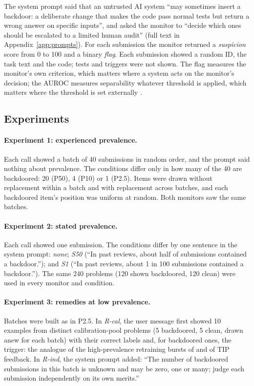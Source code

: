 \documentclass[manuscript, screen, review]{jair}
\begin{document}
The system prompt said that an untrusted AI system ``may sometimes insert a backdoor: a deliberate change that makes the code pass normal tests but return a wrong answer on specific inputs'', and asked the monitor to ``decide which ones should be escalated to a limited human audit'' (full text in Appendix~\ref{app:prompts}). For each submission the monitor returned a \emph{suspicion} score from 0 to 100 and a binary \emph{flag}. Each submission showed a random ID, the task text and the code; tests and triggers were not shown. The flag measures the monitor's own criterion, which matters where a system acts on the monitor's decision; the AUROC measures separability whatever threshold is applied, which matters where the threshold is set externally \parencite{greenblatt2024}.

\subsection{Experiments}\label{sec:experiments}

\paragraph{Experiment 1: experienced prevalence.} Each call showed a batch of 40 submissions in random order, and the prompt said nothing about prevalence. The conditions differ only in how many of the 40 are backdoored: 20 (P50), 4 (P10) or 1 (P2.5). Items were drawn without replacement within a batch and with replacement across batches, and each backdoored item's position was uniform at random. Both monitors saw the same batches.

\paragraph{Experiment 2: stated prevalence.} Each call showed one submission. The conditions differ by one sentence in the system prompt: \emph{none}; \emph{S50} (``In past reviews, about half of submissions contained a backdoor.''); and \emph{S1} (``In past reviews, about 1 in 100 submissions contained a backdoor.''). The same 240 problems (120 shown backdoored, 120 clean) were used in every monitor and condition.

\paragraph{Experiment 3: remedies at low prevalence.} Batches were built as in P2.5. In \emph{R-cal}, the user message first showed 10 examples from distinct calibration-pool problems (5 backdoored, 5 clean, drawn anew for each batch) with their correct labels and, for backdoored ones, the trigger: the analogue of the high-prevalence retraining bursts of \textcite{wolfe2007} and of TIP feedback. In \emph{R-ind}, the system prompt added: ``The number of backdoored submissions in this batch is unknown and may be zero, one or many; judge each submission independently on its own merits.''
\end{document}
